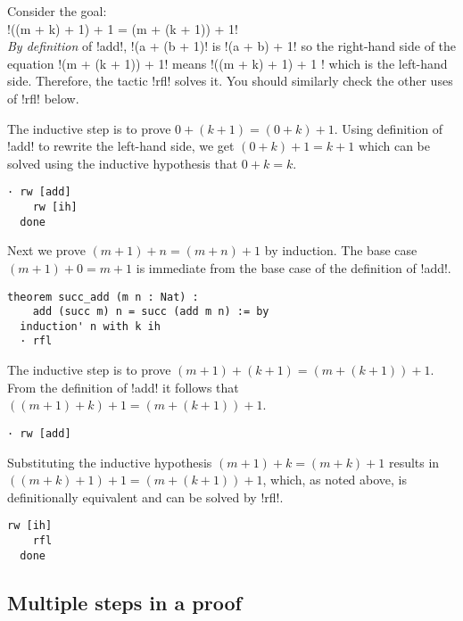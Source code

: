 
Consider the goal:\\
\indnt{}!((m + k) + 1) + 1 = (m + (k + 1)) + 1!\\
\emph{By definition} of !add!, !(a + (b + 1)! is !(a + b) + 1! so the right-hand side of the equation !(m + (k + 1)) + 1! means !((m + k) + 1) + 1 ! which is the left-hand side. Therefore, the tactic !rfl! solves it. You should similarly check the other uses of !rfl! below.

The inductive step is to prove $0+(k+1)=(0+k)+1$. Using definition of !add! to rewrite the left-hand side, we get $(0+k)+1=k+1$ which can be solved using the inductive hypothesis that $0+k=k$.
\begin{Verbatim}[firstnumber=last]
  · rw [add]
    rw [ih]
  done
\end{Verbatim}

Next we prove $(m+1)+n = (m+n)+1$ by induction. The base case $(m+1)+0=m+1$ is immediate from the base case of the definition of !add!.
\begin{Verbatim}[firstnumber=last]
theorem succ_add (m n : Nat) :
    add (succ m) n = succ (add m n) := by
  induction' n with k ih
  · rfl
\end{Verbatim}

The inductive step is to prove $(m+1) + (k+1) = (m + (k+1)) + 1$. From the definition of !add! it follows that $((m+1) + k) + 1 = (m + (k+1)) + 1$.
\begin{Verbatim}[firstnumber=last]
  · rw [add]
\end{Verbatim}
Substituting the inductive hypothesis $(m+1) + k = (m+k) + 1$ results in $((m+k) + 1) + 1 = (m + (k+1)) + 1$, which, as noted above, is definitionally equivalent and can be solved by !rfl!.
\begin{Verbatim}[firstnumber=last]
    rw [ih]
    rfl
  done
\end{Verbatim}

\subsection{Multiple steps in a proof}

